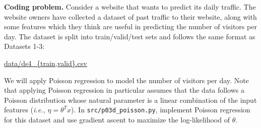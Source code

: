 \clearpage
\item {} \textbf{Coding problem.}
Consider a website that wants to predict its
daily traffic. The website owners have collected a dataset of past traffic to
their website, along with some features which they think are useful in
predicting the number of visitors per day. The dataset is split into 
train/valid/test sets and follows the same format as Datasets 1-3:
\begin{center}
	\url{data/ds4_{train,valid}.csv}
\end{center}
We will apply Poisson regression to model the number of visitors per day.
Note that applying Poisson regression in particular assumes that the data
follows a Poisson distribution whose natural parameter is a linear
combination of the input features (\emph{i.e.,} $\eta = \theta^T x$).
In \texttt{src/p03d\_poisson.py}, implement Poisson regression for this dataset
and use gradient ascent to maximize the log-likelihood of $\theta$.

\ifnum{} {
  
} \fi
